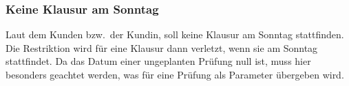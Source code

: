 \subsubsection{Keine Klausur am Sonntag}
Laut dem Kunden bzw.\ der Kundin, soll keine Klausur am Sonntag stattfinden.
Die Restriktion wird für eine Klausur dann verletzt, wenn sie am Sonntag stattfindet.
Da das Datum einer ungeplanten Prüfung null ist, muss hier besonders geachtet werden, was für
eine Prüfung als Parameter übergeben wird.